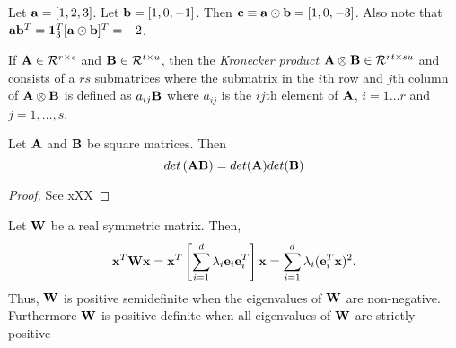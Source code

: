 Let ${\bf a} = [1, 2, 3]$. Let ${\bf b} = [1, 0, -1]$. Then
${\bf c} \equiv {\bf a} \odot {\bf b} = [1,  0, -3]$.
Also note that ${\bf a} {\bf b}^T = {\bf 1}_3^T [{\bf a} \odot {\bf b}]^T = -2$.

\begin{definition}
If ${\bf A} \in {\cal R}^{r \times s}$ and ${\bf B} \in {\cal R}^{t \times u}$,
then the {\em Kronecker product} 
${\bf A} \otimes {\bf B} \in {\cal R}^{rt \times su}$ and consists
of a $rs$ submatrices where the submatrix in the $i$th row and $j$th column
of ${\bf A} \otimes {\bf B}$ is defined as $a_{ij} {\bf B}$ where $a_{ij}$ is the
$ij$th element of ${\bf A}$, $i = 1 \ldots r$ and $j = 1, \ldots, s$.
\end{definition}


\begin{theorem}
Let ${\bf A}$ and ${\bf B}$ be square matrices.
Then 
\begin{displaymath}
det\left( {\bf A} {\bf B} \right) = det ({\bf A}) det({\bf B})
\end{displaymath}
\end{theorem}

\begin{proof}
See xXX
\end{proof}


\begin{example}
Let ${\bf W}$ be a real symmetric matrix. Then,
\begin{displaymath}
{\bf x}^T {\bf W} {\bf x} = 
{\bf x}^T \left[ \sum_{i=1}^d \lambda_i {\bf e}_i {\bf e}_i^T \right] {\bf x} =
\sum_{i=1}^d \lambda_i ({\bf e}_i^T {\bf x})^2.
\end{displaymath}
Thus, 
 ${\bf W}$ is positive semidefinite when the eigenvalues of ${\bf W}$ are non-negative.
Furthermore
${\bf W}$ is positive definite when all eigenvalues of ${\bf W}$ are strictly positive
\end{example}

